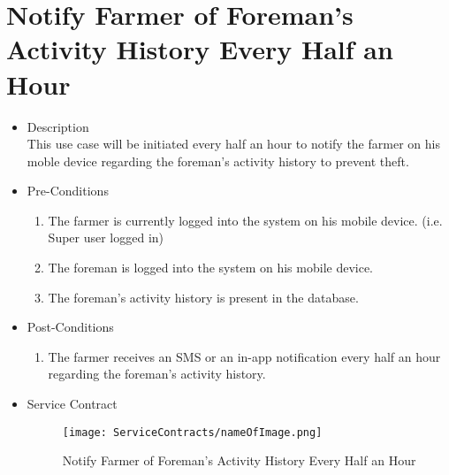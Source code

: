 \documentclass[11pt,fleqn]{book} %
\begin{document}
\section{Notify Farmer of Foreman’s Activity History Every Half an Hour}
\begin{itemize}
	\item Description\\
	This use case will be initiated every half an hour to notify the farmer on his moble device regarding the foreman’s activity history to prevent theft.
	\item Pre-Conditions
	\begin{enumerate}
		\item The farmer is currently logged into the system on his mobile device. (i.e. Super user logged in)
		\item The foreman is logged into the system on his mobile device.
		\item The foreman’s activity history is present in the database.					
	\end{enumerate}
	\item Post-Conditions
	\begin{enumerate}
		\item The farmer receives an SMS or an in-app notification every half an hour regarding the foreman’s activity history.
	\end{enumerate}
	\item Service Contract
	\begin{figure}
		\texttt{[image: ServiceContracts/nameOfImage.png]}
		\caption{Notify Farmer of Foreman’s Activity History Every Half an Hour}
		\end{figure}
\end{itemize}
\end{document}
